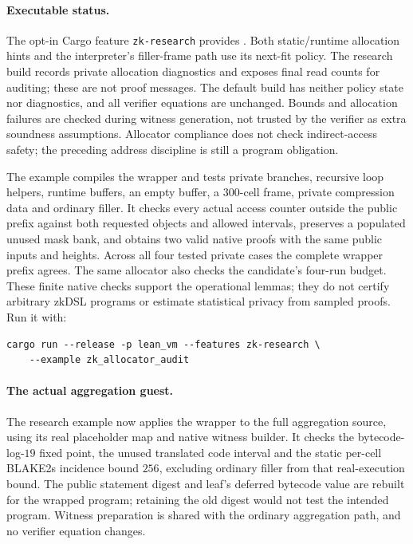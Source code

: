 \paragraph{Executable status.} The opt-in Cargo feature \texttt{zk-research} provides . Both static/runtime allocation hints and the interpreter's filler-frame path use its next-fit policy. The research build records private allocation diagnostics and exposes final read counts for auditing; these are not proof messages. The default build has neither policy state nor diagnostics, and all verifier equations are unchanged. Bounds and allocation failures are checked during witness generation, not trusted by the verifier as extra soundness assumptions. Allocator compliance does not check indirect-access safety; the preceding address discipline is still a program obligation.

The example  compiles the wrapper and tests private branches, recursive loop helpers, runtime buffers, an empty buffer, a $300$-cell frame, private compression data and ordinary filler. It checks every actual access counter outside the public prefix against both requested objects and allowed intervals, preserves a populated unused mask bank, and obtains two valid native proofs with the same public inputs and heights. Across all four tested private cases the complete wrapper prefix agrees. The same allocator also checks the candidate's four-run budget. These finite native checks support the operational lemmas; they do not certify arbitrary zkDSL programs or estimate statistical privacy from sampled proofs. Run it with:
\begin{verbatim}
cargo run --release -p lean_vm --features zk-research \
    --example zk_allocator_audit
\end{verbatim}

\paragraph{The actual aggregation guest.}\label{par:zk-guest-allocation-audit} The research example  now applies the wrapper to the full aggregation source, using its real placeholder map and native witness builder. It checks the bytecode-log-$19$ fixed point, the unused translated code interval and the static per-cell BLAKE2s incidence bound $256$, excluding ordinary filler from that real-execution bound. The public statement digest and leaf's deferred bytecode value are rebuilt for the wrapped program; retaining the old digest would not test the intended program. Witness preparation is shared with the ordinary aggregation path, and no verifier equation changes.

